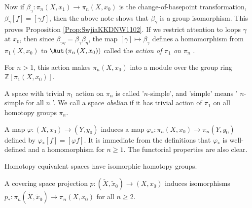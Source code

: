 \begin{definition}
  Now if $\beta_{\gamma} \colon \pi_n(X,x_1) \to 
  \pi_n(X, x_0)$ is the change-of-basepoint transformation,
   $\beta_{\gamma}\left[ f \right] =
   \left[ \gamma f \right] $, then
   the above note shows that $\beta_\gamma$ is a group isomorphism.
   This proves Proposition \ref{Prop:SwjiaKKDNW1102}. 
   If we restrict attention to loops
   $\gamma$ at $x_0$, then since $\beta_{\gamma \eta}=
   \beta_{\gamma} \beta_{\eta}$, the map
   $\left[ \gamma \right] \mapsto \beta_{\gamma}$ 
   defines a homomorphism from
   $\pi_1\left( X, x_0 \right) $ to
   $\Aut \left( \pi_n \left( X,x_0 \right)  \right) $ 
   called the \textit{action of $\pi_1$ on $\pi_n$ }.
  \end{definition}

  \begin{note}
  For $n>1$, this action makes
  $\pi_n(X,x_0)$ into a module over the group ring
  $\mathbb{Z}\left[ \pi_1 \left( X,x_0 \right)  \right] $.
  \end{note}  

  \begin{definition}
      A space with trivial $\pi_1$ action on $\pi_n$ is called
      '$n$-simple', and 'simple' means
      ' $n$-simple for all $n$ '. We call
      a space \textit{abelian} if it has
      trivial action of $\pi_1$ on all homotopy groups
      $\pi_n$.
  \end{definition}

  \begin{proposition}[$\pi_n$ is a functor]
      A map $\varphi  \colon \left( X, x_0 \right) \to 
      \left( Y, y_0 \right) $ induces a map
      $\varphi_* \colon \pi_n \left( X, x_0 \right) \to 
      \pi_n \left( Y, y_0 \right) $ defined by
      $\varphi_* \left[ f \right] = \left[ \varphi  f \right] $.
      It is immediate from the definitions that
      $\varphi_*$ is well-defined and a homomorphism
      for $n\ge 1$. The functorial properties are also clear.
  \end{proposition}

  \begin{corollary}
      Homotopy equivalent spaces have isomorphic
      homotopy groups.
  \end{corollary}

  \begin{proposition}[]
      A covering space projection
      $p \colon \left( \tilde{X}, \tilde{x}_0 \right) \to 
      \left( X, x_0 \right) $ induces isomorphisms
      $p_* \colon \pi_n \left( \tilde{X}, \tilde{x}_0 \right) 
      \to \pi_n \left( X, x_0 \right) $ for all
      $n \ge 2$.
  \end{proposition}

